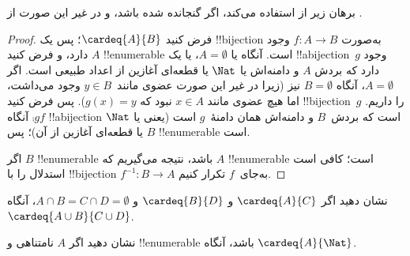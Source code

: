 \documentclass[../../../include/open-logic-section]{subfiles}
\begin{document}
\begin{editorial}
برهان زیر از  استفاده می‌کند، اگر
 گنجانده شده باشد، و در غیر این صورت از
.
\end{editorial}

\begin{proof}
فرض کنید $\cardeq{A}{B}$؛ پس یک !!{bijection} به‌صورت $f \colon A
\to B$ وجود دارد، و فرض کنید $A$ !!{enumerable} است.
{
  آنگاه یا $A  = \emptyset$، یا یک !!a{bijection}~$g$ وجود دارد که
  بردش $A$ و دامنه‌اش یا $\Nat$ یا قطعه‌ای آغازین از اعداد طبیعی
  است. اگر $A = \emptyset$، آنگاه $B =
  \emptyset$ نیز (زیرا در غیر این صورت عضوی مانند~$y \in B$ وجود می‌داشت، اما
  هیچ عضوی مانند $x
  \in A$ نبود که $g(x) = y$). پس فرض کنید !!{bijection}~$g$ را
  داریم. آنگاه $\comp{g}{f}$ !!a{bijection} است که بردش~$B$ و دامنه‌اش
  همان دامنهٔ~$g$ است (یعنی یا $\Nat$ یا قطعه‌ای آغازین از آن)؛ پس
  $B$ !!{enumerable} است.}

اگر $B$ !!{enumerable} باشد، نتیجه می‌گیریم که $A$ !!{enumerable} است؛
کافی است استدلال را با !!{bijection} $f^{-1}\colon B \to A$ به‌جای~$f$
تکرار کنیم.
\end{proof}

\begin{prob}
نشان دهید اگر $\cardeq{A}{C}$ و $\cardeq{B}{D}$ و $A \cap B =
C \cap D = \emptyset$، آنگاه $\cardeq{A \cup B}{C \cup D}$.
\end{prob}

\begin{prob}
نشان دهید اگر $A$ نامتناهی و !!{enumerable} باشد، آنگاه
$\cardeq{A}{\Nat}$.
\end{prob}
\end{document}
